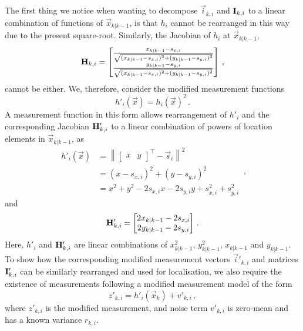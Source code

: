 \documentclass[10pt,letterpaper,oneside,twocolumn,journal]{IEEEtran}
\theoremstyle{definition}
\theoremstyle{definition}
\theoremstyle{remark}
\begin{document}
The first thing we notice when wanting to decompose $\vec{i}_{k,i}$ and ${{\mathbf{I}}}_{k,i}$ to a linear combination of functions of $\vec{x}_{k|k-1}$, is that $h_i$ cannot be rearranged in this way due to the present square-root. Similarly, the Jacobian of $h_i$ at $\vec{x}_{k|k-1}$,
\begin{equation}
    {\ensuremath{{\mathbf{H}}}}_{k,i} = 
    \begin{bmatrix}
        \frac{x_{k|k-1} - s_{x,i}}{\sqrt{(x_{k|k-1} - s_{x,i})^2 + (y_{k|k-1} - s_{y,i})^2}} \\
        \frac{y_{k|k-1} - s_{y,i}}{\sqrt{(x_{k|k-1} - s_{x,i})^2 + (y_{k|k-1} - s_{y,i})^2}} 
    \end{bmatrix}\,,
\end{equation}
cannot be either. We, therefore, consider the modified measurement functions
\begin{equation}
    h'_i(\vec{x}) = h_i(\vec{x})^2\,. \label{eqn:modified_measurement_func}
\end{equation}
A measurement function in this form allows rearrangement of $h'_i$ and the corresponding Jacobian ${{\mathbf{H}}}'_{k,i}$ to a linear combination of powers of location elements in $\vec{x}_{k|k-1}$, as
\begin{equation}
    \begin{split}
        h'_i(\vec{x}) &= \left\lVert
        \begin{bmatrix}
            x & y
        \end{bmatrix}^\top - \vec{s}_i\right\rVert^2 \\
        &= (x - s_{x,i})^2 + (y - s_{y,i})^2 \\
        &= x^2 + y^2 -2s_{x,i}x -2s_{y,i}y +s_{x,i}^2 +s_{y,i}^2
    \end{split}\,,
\end{equation}
and
\begin{equation}
    \mat{H}'_{k,i} = 
    \begin{bmatrix}
        2x_{k|k-1} - 2s_{x,i} \\
        2y_{k|k-1} - 2s_{y,i}
    \end{bmatrix}\,. \label{eqn:modified_jacobian}
\end{equation}
Here, $h'_i$ and ${{\mathbf{H}}}'_{k,i}$ are linear combinations of $x_{k|k-1}^2$, $y_{k|k-1}^2$, $x_{k|k-1}$ and $y_{k|k-1}$. To show how the corresponding modified measurement vectors $\vec{i}'_{k,i}$ and matrices ${{\mathbf{I}}}'_{k,i}$ can be similarly rearranged and used for localisation, we also require the existence of measurements following a modified measurement model of the form
\begin{equation}
    z'_{k,i} = h'_i(\vec{x}_k)+v'_{k,i}\,, \label{eqn:modified_measurement_model}
\end{equation}
where $z'_{k,i}$ is the modified measurement, and noise term $v'_{k,i}$ is zero-mean and has a known variance $r_{k,i}$.
\end{document}
